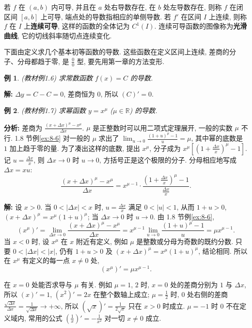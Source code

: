 \documentclass[UTF8,openany]{ctexbook}
\theoremstyle{chinesetextbook}
\newtheorem{example}{例}[section]
\newenvironment{cnsolution}{\par\indent\textbf{解:} \ignorespaces}{\par}
\begin{document}
若 $f$ 在 $(a,b)$ 内可导, 并且在 $a$ 处右导数存在, 在 $b$ 处左导数存在, 则称 $f$ 在闭区间 $[a,b]$ 上可导, 端点处的导数指相应的单侧导数. 若 $f'$ 在区间 $I$ 上连续, 则称 $f$ 在 $I$ 上\textbf{连续可导}, 这样的函数的全体记为 $C^1(I)$. 连续可导函数的图像称为\textbf{光滑曲线}, 它的切线斜率随切点连续变化.

下面由定义求几个基本初等函数的导数. 这些函数在定义区间上连续, 差商的分子、分母都趋于零, 是 $\displaystyle\frac00$ 型, 要先用第一章的方法变形.
\begin{example}\label{ex:c2-1-6}
\textnormal{(教材例1.6)} 求常数函数 $f(x)=C$ 的导数.
\end{example}
\begin{cnsolution}
$\Delta y=C-C=0$, 差商恒为 $0$, 所以 $(C)'=0$.
\end{cnsolution}
\begin{example}\label{ex:c2-1-7}
\textnormal{(教材例1.7)} 求幂函数 $y=x^\mu$ ($\mu\in\mathbb R$) 的导数.
\end{example}
\par\indent\textbf{分析:} 差商为 $\displaystyle\frac{(x+\Delta x)^\mu-x^\mu}{\Delta x}$. $\mu$ 是正整数时可以用二项式定理展开, 一般的实数 $\mu$ 不行. 1.8 节例\ref{ex:8-6} 对一般的 $\mu$ 求出了 $\displaystyle\lim_{u\to0}\frac{(1+u)^\mu-1}u=\mu$, 其中幂的底数是 $1$ 加上趋于零的量. 为了凑出这样的底数, 提出 $x^\mu$, 分子成为 $\displaystyle x^\mu\left[\left(1+\frac{\Delta x}x\right)^\mu-1\right]$. 记 $\displaystyle u=\frac{\Delta x}x$, 则 $\Delta x\to0$ 时 $u\to0$, 方括号正是这个极限的分子. 分母相应地写成 $\Delta x=xu$:
\[
\frac{(x+\Delta x)^\mu-x^\mu}{\Delta x}=x^{\mu-1}\cdot\frac{\left(1+\frac{\Delta x}x\right)^\mu-1}{\frac{\Delta x}x}.
\]
\begin{cnsolution}
设 $x>0$. 当 $0<|\Delta x|<x$ 时, $\displaystyle u=\frac{\Delta x}x$ 满足 $0<|u|<1$, 从而 $1+u>0$, $(x+\Delta x)^\mu=x^\mu(1+u)^\mu$; 当 $\Delta x\to0$ 时 $u\to0$. 由 1.8 节例\ref{ex:8-6},
\[
(x^\mu)'=\lim_{\Delta x\to0}\frac{(x+\Delta x)^\mu-x^\mu}{\Delta x}=x^{\mu-1}\lim_{u\to0}\frac{(1+u)^\mu-1}u=\mu x^{\mu-1}.
\]
当 $x<0$ 时, 设 $x^\mu$ 在 $x$ 附近有定义, 例如 $\mu$ 是整数或分母为奇数的既约分数. 只要 $0<|\Delta x|<|x|$, 仍有 $1+u>0$ 及 $(x+\Delta x)^\mu=x^\mu(1+u)^\mu$, 结论相同. 所以在 $x^\mu$ 有定义的每一点 $x\ne0$ 处,
\[
(x^\mu)'=\mu x^{\mu-1}.
\]
\end{cnsolution}
在 $x=0$ 处能否求导与 $\mu$ 有关. 例如 $\mu=1$, $2$ 时, $x=0$ 处的差商分别为 $1$ 与 $\Delta x$, 所以 $(x)'=1$, $(x^2)'=2x$ 在整个数轴上成立; $\displaystyle\mu=\frac12$ 时, $0$ 处右侧的差商 $\displaystyle\frac{\sqrt{\Delta x}}{\Delta x}=\frac1{\sqrt{\Delta x}}\to+\infty$, 所以 $\displaystyle\left(\sqrt x\right)'=\frac1{2\sqrt x}$ 只在 $x>0$ 时成立. $\mu=-1$ 时 $0$ 不在定义域内, 常用的公式 $\displaystyle\left(\frac1x\right)'=-\frac1{x^2}$ 对一切 $x\ne0$ 成立.
\end{document}
